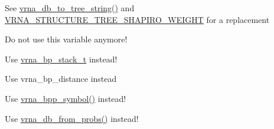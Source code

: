 \begin{DoxyRefList}
%
See \mbox{\hyperlink{group__struct__utils__tree_ga56551ab7da64933a7230d29430f40cfe}{vrna\+\_\+db\+\_\+to\+\_\+tree\+\_\+string()}} and \mbox{\hyperlink{group__struct__utils__tree_ga91f2e3a3a502d5445fd7fe5983a5fe92}{V\+R\+N\+A\+\_\+\+S\+T\+R\+U\+C\+T\+U\+R\+E\+\_\+\+T\+R\+E\+E\+\_\+\+S\+H\+A\+P\+I\+R\+O\+\_\+\+W\+E\+I\+G\+HT}} for a replacement 
\item[Global \mbox{\hyperlink{fold__vars_8h_a0244a629b5ab4f58b77590c3dfd130dc}{base\+\_\+pair}} ]\label{deprecated__deprecated000081}%
%
Do not use this variable anymore!  
\item[Global \mbox{\hyperlink{group__data__structures_gaaeed53a7508c6ce549a98223e94b25df}{bondT}} ]\label{deprecated__deprecated000216}%
%
Use \mbox{\hyperlink{group__data__structures_gaa651bda42e7692f08cb603cd6834b0ee}{vrna\+\_\+bp\+\_\+stack\+\_\+t}} instead!  
\item[Global \mbox{\hyperlink{group__struct__utils__deprecated_ga6ebbcd29a754f0e4f1a66d1fd84184db}{bp\+\_\+distance}} (const char $\ast$str1, const char $\ast$str2)]\label{deprecated__deprecated000204}%
%
Use vrna\+\_\+bp\+\_\+distance instead


\item[Global \mbox{\hyperlink{group__struct__utils__deprecated_ga49962ad6242b8c628de6ca16bb831c1d}{bppm\+\_\+symbol}} (const float $\ast$x)]\label{deprecated__deprecated000211}%
%
Use \mbox{\hyperlink{group__struct__utils_ga025bff1b27fa46534c8fae6980f64bb5}{vrna\+\_\+bpp\+\_\+symbol()}} instead!


\item[Global \mbox{\hyperlink{group__struct__utils__deprecated_ga129d81c4a1ead793c5b2311333e03dfa}{bppm\+\_\+to\+\_\+structure}} (char $\ast$structure, F\+L\+T\+\_\+\+O\+R\+\_\+\+D\+BL $\ast$pr, unsigned int length)]\label{deprecated__deprecated000210}%
%
Use \mbox{\hyperlink{group__struct__utils_ga0c28c410a5ab22d6ab9c77a84e8d5b44}{vrna\+\_\+db\+\_\+from\+\_\+probs()}} instead!



\end{DoxyRefList}
